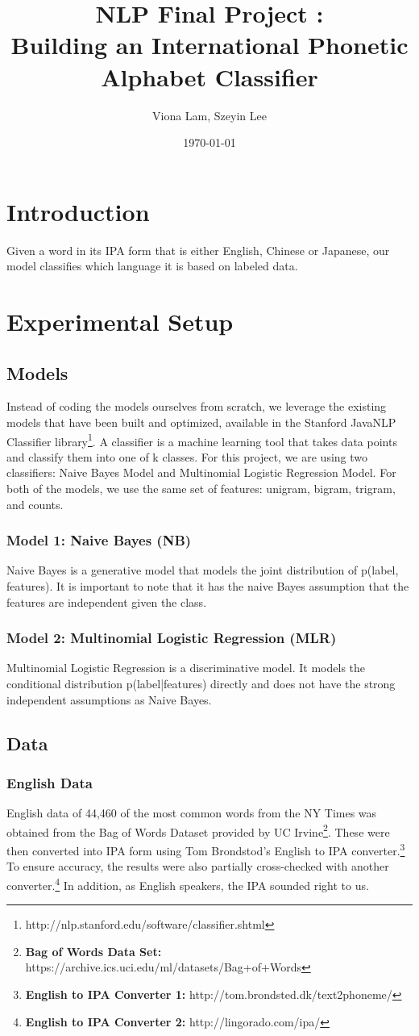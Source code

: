 \documentclass[a4paper]{article}
\title{NLP Final Project : \\
Building an International Phonetic Alphabet Classifier}
\author{Viona Lam, Szeyin Lee}
\date{\today}
\begin{document}
\maketitle


\section{Introduction}
Given a word in its IPA form that is either English, Chinese or Japanese, our model classifies which language it is based on labeled data.
\section{Experimental Setup}
\subsection{Models}
Instead of coding the models ourselves from scratch, we leverage the existing models that have been built and optimized, available in the Stanford JavaNLP Classifier library\footnote{http://nlp.stanford.edu/software/classifier.shtml}. A classifier is a machine learning tool that takes data points and classify them into one of k classes. For this project, we are using two classifiers: Naive Bayes Model and Multinomial Logistic Regression Model. For both of the models, we use the same set of features: unigram, bigram, trigram, and counts. 
\subsubsection{Model 1: Naive Bayes (NB)}
Naive Bayes is a generative model that models the joint distribution of p(label, features). It is important to note that it has the naive Bayes assumption that the features are independent given the class.
\subsubsection{Model 2: Multinomial Logistic Regression (MLR)}
Multinomial Logistic Regression is a discriminative model. It models the
conditional distribution p(label|features) directly and does not have the strong independent assumptions as Naive Bayes.
\subsection{Data}
\subsubsection{English Data}
English data of 44,460 of the most common words from the NY Times was obtained from the Bag of Words Dataset provided by UC Irvine\footnote{\textbf{Bag of Words Data Set:} https://archive.ics.uci.edu/ml/datasets/Bag+of+Words}. These were then converted into IPA form using Tom Brondstod's English to IPA converter.\footnote{\textbf{English to IPA Converter 1:} http://tom.brondsted.dk/text2phoneme/} To ensure accuracy, the results were also partially cross-checked with another converter.\footnote{\textbf{English to IPA Converter 2: }http://lingorado.com/ipa/} In addition, as English speakers, the IPA sounded right to us.
\end{document}
